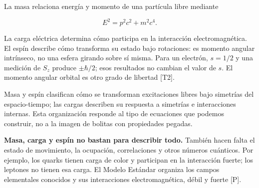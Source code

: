 \documentclass[
  spanish,
  10pt,
  a4paper,
]{article}
\begin{document}
La masa relaciona energía y momento de una partícula libre mediante

\[
E^2=p^2c^2+m^2c^4.
\tag{E.1}
\]

La carga eléctrica determina cómo participa en la interacción
electromagnética. El espín describe cómo transforma su estado bajo
rotaciones: es momento angular intrínseco, no una esfera girando sobre
sí misma. Para un electrón, \(s=1/2\) y una medición de \(S_z\) produce
\(\pm\hbar/2\); esos resultados no cambian el valor de \(s\). El momento
angular orbital es otro grado de libertad {[}T2{]}.

Masa y espín clasifican cómo se transforman excitaciones libres bajo
simetrías del espacio-tiempo; las cargas describen su respuesta a
simetrías e interacciones internas. Esta organización responde al tipo
de ecuaciones que podemos construir, no a la imagen de bolitas con
propiedades pegadas.

\textbf{Masa, carga y espín no bastan para describir todo.} También
hacen falta el estado de movimiento, la ocupación, correlaciones y otros
números cuánticos. Por ejemplo, los quarks tienen carga de color y
participan en la interacción fuerte; los leptones no tienen esa carga.
El Modelo Estándar organiza los campos elementales conocidos y sus
interacciones electromagnética, débil y fuerte {[}P{]}.
\end{document}
